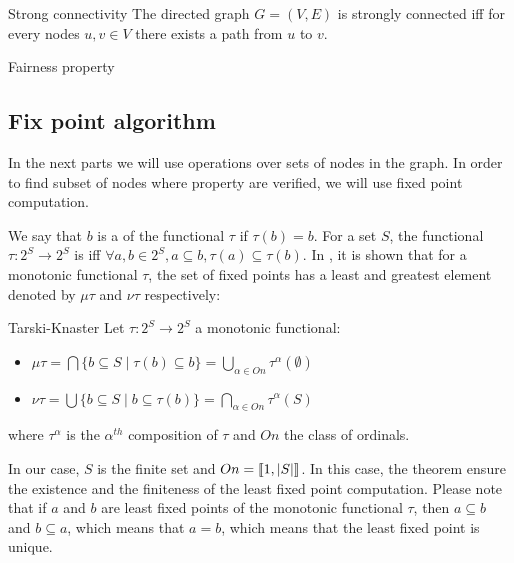 \begin{nameddef}{Strong connectivity}
The directed graph $G = (V,E)$ is strongly connected iff for every nodes $u,v \in V$ there exists a path from $u$ to $v$.
\end{nameddef}


\begin{nameddef}{Fairness property}

\end{nameddef}

\subsection{Fix point algorithm}

In the next parts we will use operations over sets of nodes in the graph. In order to find subset of nodes where property are verified, we will use fixed point computation.

We say that $b$ is a  of the functional $\tau$ if $\tau(b) = b$.
For a set $S$, the functional $\tau: 2^S \rightarrow 2^S$ is   iff $\forall a,b \in 2^S, a \subseteq b, \tau(a) \subseteq \tau(b)$.
In \cite{tarski}, it is shown that for a monotonic functional $\tau$,
the set of fixed points has a least and greatest element denoted by $\mu \tau$ and $\nu \tau$ respectively:

\begin{namedtheo}{Tarski-Knaster}\label{th:tarski}
Let $\tau:2^S \rightarrow 2^S$ a monotonic functional:
\begin{itemize}
\item $\mu \tau = \bigcap \{b \subseteq S \mid \tau(b) \subseteq b\} = \bigcup_{\alpha \in On} \tau^{\alpha}(\emptyset)$
\item $\nu \tau = \bigcup \{b \subseteq S \mid b \subseteq \tau(b) \} = \bigcap_{\alpha \in On} \tau^{\alpha}(S)$
\end{itemize}
where $\tau^{\alpha}$ is the $\alpha^{th}$ composition of $\tau$ and $On$ the class of ordinals.
\end{namedtheo}
In our case, $S$ is the finite set and $On = \left \llbracket 1,|S|\right \rrbracket$. 
In this case, the theorem ensure the existence and the finiteness of the least fixed point computation.
Please note that if $a$ and $b$ are least fixed points of the monotonic functional $\tau$, then $a \subseteq b$ and $b \subseteq a$, which means that $a=b$, which means that the least fixed point is unique.

